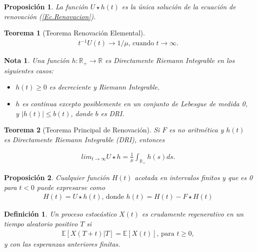 \documentclass{article}
\newtheorem{Def}{Definición}[section]
\newtheorem{Teo}{Teorema}[section]
\newtheorem{Note}{Nota}[section]
\newtheorem{Prop}{Proposición}[section]
\newcommand{\rea}{\mathbb{R}}
\newcommand{\esp}{\mathbb{E}}
\numberwithin{equation}{section}
\begin{document}
\begin{Prop}
La funci\'on $U\star h\left(t\right)$ es la \'unica soluci\'on de la ecuaci\'on de renovaci\'on (\ref{Ec.Renovacion}).
\end{Prop}

\begin{Teo}[Teorema Renovaci\'on Elemental]
\begin{eqnarray*}
t^{-1}U\left(t\right)\rightarrow 1/\mu\textrm{,    cuando }t\rightarrow\infty.
\end{eqnarray*}
\end{Teo}


\begin{Note} Una funci\'on $h:\rea_{+}\rightarrow\rea$ es Directamente Riemann Integrable en los siguientes casos:
\begin{itemize}
\item[a)] $h\left(t\right)\geq0$ es decreciente y Riemann Integrable.
\item[b)] $h$ es continua excepto posiblemente en un conjunto de Lebesgue de medida 0, y $|h\left(t\right)|\leq b\left(t\right)$, donde $b$ es DRI.
\end{itemize}
\end{Note}

\begin{Teo}[Teorema Principal de Renovaci\'on]
Si $F$ es no aritm\'etica y $h\left(t\right)$ es Directamente Riemann Integrable (DRI), entonces

\begin{eqnarray*}
lim_{t\rightarrow\infty}U\star h=\frac{1}{\mu}\int_{\rea_{+}}h\left(s\right)ds.
\end{eqnarray*}
\end{Teo}

\begin{Prop}
Cualquier funci\'on $H\left(t\right)$ acotada en intervalos finitos y que es 0 para $t<0$ puede expresarse como
\begin{eqnarray*}
H\left(t\right)=U\star h\left(t\right)\textrm{,  donde }h\left(t\right)=H\left(t\right)-F\star H\left(t\right)
\end{eqnarray*}
\end{Prop}

\begin{Def}
Un proceso estoc\'astico $X\left(t\right)$ es crudamente regenerativo en un tiempo aleatorio positivo $T$ si
\begin{eqnarray*}
\esp\left[X\left(T+t\right)|T\right]=\esp\left[X\left(t\right)\right]\textrm{, para }t\geq0,\end{eqnarray*}
y con las esperanzas anteriores finitas.
\end{Def}
\end{document}
